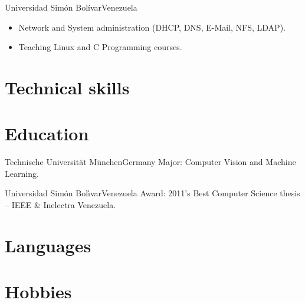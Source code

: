 \documentclass[10pt]{moderncv}
\begin{document}
 {Universidad Sim\'{o}n Bol\'{i}var}{Venezuela}{}{%
\begin{itemize}
  \item Network and System administration (DHCP, DNS, E-Mail, NFS, LDAP).
  \item Teaching Linux and C Programming courses.
\end{itemize}
}

\section{Technical skills}



\section{Education}

  {Technische Universit\"at M\"unchen}{Germany}{}{%
    Major: Computer Vision and Machine Learning.
  }

  {Universidad Sim\'on Bol\'{\i}var}{Venezuela}{}{%
    Award: 2011's Best Computer Science thesis -- IEEE \& Inelectra Venezuela.
  }


\section{Languages}


\section{Hobbies}
\end{document}

